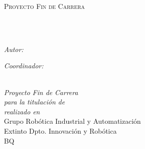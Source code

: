 \documentclass[
11pt, %
{english, spanish}, %
singlespacing, %
headsepline, %
]{MastersDoctoralThesis} %
\author{Marcial \textsc{Rodríguez}} %
\begin{document}
\frontmatter %

\pagestyle{plain} %


\begin{titlepage}
\begin{center}

\vspace*{.06\textheight}
{\scshape\LARGE \univname\par}\vspace{0.1cm} %
{\scshape\Large \facname\par}\vspace{0.8cm} %
\textsc{\Large Proyecto Fin de Carrera}\\[0.2cm] %

\HRule \\[0.6cm] %
{\huge \bfseries \ttitle\par}\vspace{0.2cm} %
\HRule \\[1.2cm] %

\begin{minipage}[t]{0.4\textwidth}
\begin{flushleft} \large
\emph{Autor:}\\
\href{http://uborzz.es}{\authorname} %
\end{flushleft}
\end{minipage}
\begin{minipage}[t]{0.4\textwidth}
\begin{flushright} \large
\emph{Coordinador:} \\
\href{}{\supname} %
\end{flushright}
\end{minipage}\\[0.1cm]

\vfill
\large \textit{Proyecto Fin de Carrera \\ para la titulación de \degreename}\\[0.3cm] %
\textit{realizado en}\\[0.4cm]
Grupo Robótica Industrial y Automatización\\Extinto Dpto. Innovación y Robótica\\BQ\\[2cm] %


\end{center}
\end{titlepage}
\end{document}
